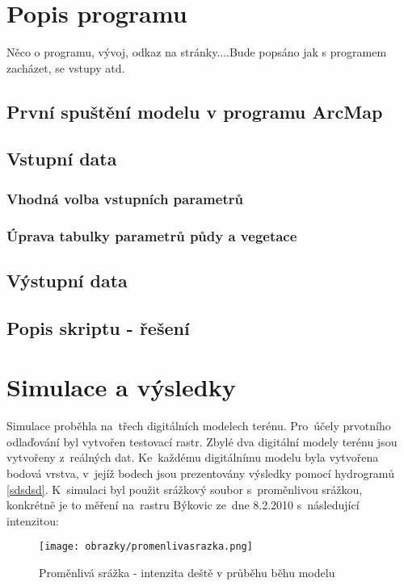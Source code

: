 \chapter{Popis programu} \label{chapter:manual}
Něco o programu, vývoj, odkaz na stránky....Bude popsáno jak s programem zacházet, se vstupy atd.
\section{První spuštění modelu v programu ArcMap} \label{section:prvnispusteni}

\section{Vstupní data} \label{section:data}
\subsection{Vhodná volba vstupních parametrů} \label{subsection:volbaparametru}
\subsection{Úprava tabulky parametrů půdy a vegetace} \label{subsection:upravatabulkyparametru}
\section{Výstupní data} \label{section:vystupnidata}
\section{Popis skriptu - řešení} \label{section:kod}
\chapter{Simulace a výsledky} \label{chapter:testy}
Simulace proběhla na~třech digitálních modelech terénu. Pro~účely prvotního odlaďování byl vytvořen testovací rastr. Zbylé dva digitální modely terénu jsou vytvořeny z~reálných dat.
Ke~každému digitálnímu modelu byla vytvořena bodová vrstva, v~jejíž bodech jsou prezentovány výsledky pomocí hydrogramů \ref{sdsdsd}. K~simulaci byl použit srážkový soubor s~proměnlivou srážkou, konkrétně je to měření na~rastru Býkovic ze~dne 8.2.2010 s~následující intenzitou:
\begin{figure}[hbt]
  \centering
  \texttt{[image: obrazky/promenlivasrazka.png]}
  \caption{Proměnlivá srážka - intenzita deště v průběhu běhu modelu}
  \label{fig:promenlivasrazka}
\end{figure}
 
